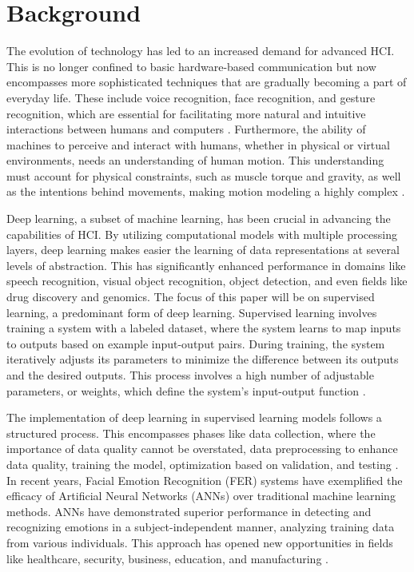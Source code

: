 \documentclass[runningheads]{llncs}
\begin{document}
\section{Background}
\label{sec:background}

The evolution of technology has led to an increased demand for advanced HCI. This is no longer confined to basic hardware-based communication but now encompasses more sophisticated techniques that are gradually becoming a part of everyday life. These include voice recognition, face recognition, and gesture recognition, which are essential for facilitating more natural and intuitive interactions between humans and computers \cite{Alrowais2023}. Furthermore, the ability of machines to perceive and interact with humans, whether in physical or virtual environments, needs an understanding of human motion. This understanding must account for physical constraints, such as muscle torque and gravity, as well as the intentions behind movements, making motion modeling a highly complex \cite{Martinez2017}.

Deep learning, a subset of machine learning, has been crucial in advancing the capabilities of HCI. By utilizing computational models with multiple processing layers, deep learning makes easier the learning of data representations at several levels of abstraction. This has significantly enhanced performance in domains like speech recognition, visual object recognition, object detection, and even fields like drug discovery and genomics. The focus of this paper will be on supervised learning, a predominant form of deep learning. Supervised learning involves training a system with a labeled dataset, where the system learns to map inputs to outputs based on example input-output pairs. During training, the system iteratively adjusts its parameters to minimize the difference between its outputs and the desired outputs. This process involves a high number of adjustable parameters, or weights, which define the system's input-output function \cite{Lecun2015} \cite{Mahony2020}.

The implementation of deep learning in supervised learning models follows a structured process. This encompasses phases like data collection, where the importance of data quality cannot be overstated, data preprocessing to enhance data quality, training the model, optimization based on validation, and testing \cite{Schmidhuber2015}. In recent years, Facial Emotion Recognition (FER) systems have exemplified the efficacy of Artificial Neural Networks (ANNs) over traditional machine learning methods. ANNs have demonstrated superior performance in detecting and recognizing emotions in a subject-independent manner, analyzing training data from various individuals. This approach has opened new opportunities in fields like healthcare, security, business, education, and manufacturing \cite{Giannopoulos2018} \cite{Cirneanu2023} \cite{Zhao2015}.
\end{document}
